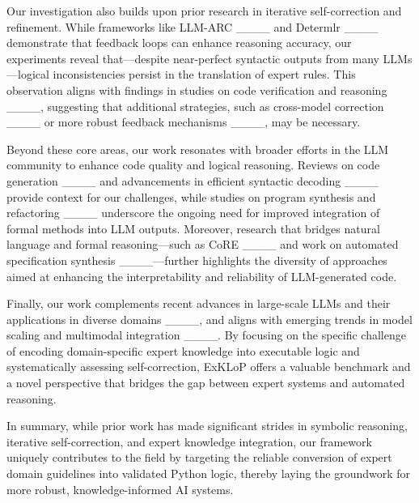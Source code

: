 Our investigation also builds upon prior research in iterative self-correction and refinement. While frameworks like LLM-ARC ____ and Determlr ____ demonstrate that feedback loops can enhance reasoning accuracy, our experiments reveal that—despite near-perfect syntactic outputs from many LLMs—logical inconsistencies persist in the translation of expert rules. This observation aligns with findings in studies on code verification and reasoning ____, suggesting that additional strategies, such as cross-model correction ____ or more robust feedback mechanisms ____, may be necessary.

Beyond these core areas, our work resonates with broader efforts in the LLM community to enhance code quality and logical reasoning. Reviews on code generation ____ and advancements in efficient syntactic decoding ____ provide context for our challenges, while studies on program synthesis and refactoring ____ underscore the ongoing need for improved integration of formal methods into LLM outputs. Moreover, research that bridges natural language and formal reasoning—such as CoRE ____ and work on automated specification synthesis ____—further highlights the diversity of approaches aimed at enhancing the interpretability and reliability of LLM-generated code.

Finally, our work complements recent advances in large-scale LLMs and their applications in diverse domains ____, and aligns with emerging trends in model scaling and multimodal integration ____. By focusing on the specific challenge of encoding domain-specific expert knowledge into executable logic and systematically assessing self-correction, ExKLoP offers a valuable benchmark and a novel perspective that bridges the gap between expert systems and automated reasoning.

In summary, while prior work has made significant strides in symbolic reasoning, iterative self-correction, and expert knowledge integration, our framework uniquely contributes to the field by targeting the reliable conversion of expert domain guidelines into validated Python logic, thereby laying the groundwork for more robust, knowledge-informed AI systems.






